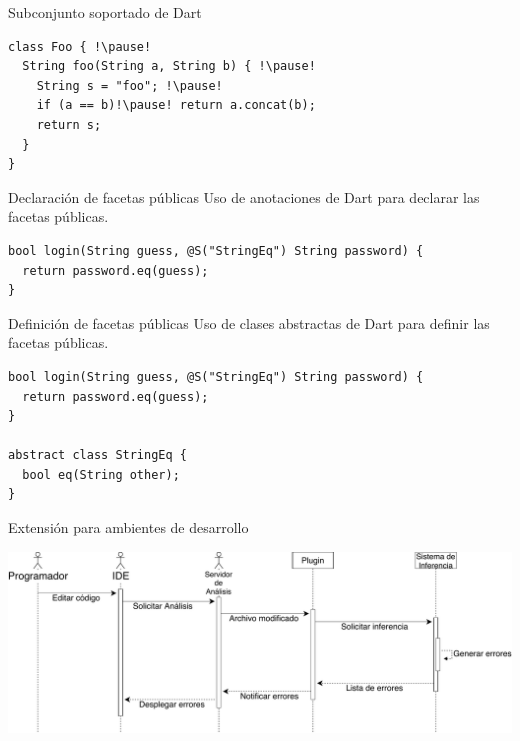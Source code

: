 \documentclass[aspectratio=169,18pt]{beamer}
\begin{document}
\begin{frame}[fragile]{Subconjunto soportado de Dart}
	\begin{center}
	\begin{lstlisting}[escapechar=!,basicstyle=\fontsize{10}{10}\ttfamily]
class Foo { !\pause!
  String foo(String a, String b) { !\pause!
    String s = "foo"; !\pause!
    if (a == b)!\pause! return a.concat(b);
    return s;
  }
}
  \end{lstlisting}
	\end{center}
\end{frame}

\begin{frame}[fragile]{Declaración de facetas públicas}
	Uso de anotaciones de Dart para declarar las facetas públicas. \\ \pause
	\vspace{1cm}
\begin{lstlisting}[escapechar=?,basicstyle=\fontsize{10}{10}\ttfamily]
bool login(String guess, @S("StringEq") String password) {
  return password.eq(guess);
}
\end{lstlisting}
\end{frame}

\begin{frame}[fragile]{Definición de facetas públicas}
	Uso de clases abstractas de Dart para definir las facetas públicas. \\ \pause
	\vspace{1cm}
\begin{lstlisting}[escapechar=?,basicstyle=\fontsize{10}{10}\ttfamily]
bool login(String guess, @S("StringEq") String password) {
  return password.eq(guess);
}

abstract class StringEq {
  bool eq(String other);
}
\end{lstlisting}
\end{frame}

\begin{frame}[fragile]{Extensión para ambientes de desarrollo}
	\begin{center}
		\includegraphics[width=1.0\textwidth]{images/sequence.pdf}
	\end{center}
\end{frame}
\end{document}
